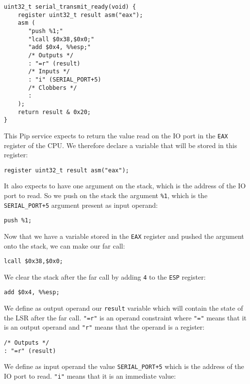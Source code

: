 \documentclass[10pt,a4paper,titlepage]{refart}
\begin{document}
\begin{lstlisting}[style=CStyle]
uint32_t serial_transmit_ready(void) {
    register uint32_t result asm("eax");
    asm (
       "push %1;"
       "lcall $0x38,$0x0;"
       "add $0x4, %%esp;"
       /* Outputs */
       : "=r" (result)
       /* Inputs */
       : "i" (SERIAL_PORT+5)
       /* Clobbers */
       :
    );
    return result & 0x20;
}
\end{lstlisting}

This Pip service expects to return the value read on the IO port in the
\texttt{EAX} register of the CPU. We therefore declare a variable that will be
stored in this register:

\begin{lstlisting}[style=CStyle]
register uint32_t result asm("eax");
\end{lstlisting}

It also expects to have one argument on the stack, which is the address of the
IO port to read. So we push on the stack the argument \texttt{\%1}, which is the
\texttt{SERIAL\_PORT+5} argument present as input operand:

\begin{lstlisting}
push %1;
\end{lstlisting}

Now that we have a variable stored in the \texttt{EAX} register and pushed the
argument onto the stack, we can make our far call:

\begin{lstlisting}
lcall $0x38,$0x0;
\end{lstlisting}

We clear the stack after the far call by adding \texttt{4} to the \texttt{ESP}
register:

\begin{lstlisting}
add $0x4, %%esp;
\end{lstlisting}

We define as output operand our \texttt{result} variable which will contain the
state of the LSR after the far call. \texttt{"=r"} is an operand constraint
where \texttt{"="} means that it is an output operand and \texttt{"r"} means that the
operand is a register:

\begin{lstlisting}[style=CStyle]
/* Outputs */
: "=r" (result)
\end{lstlisting}

We define as input operand the value \texttt{SERIAL\_PORT+5} which is the
address of the IO port to read. \texttt{"i"} means that it is an immediate
value:
\end{document}
